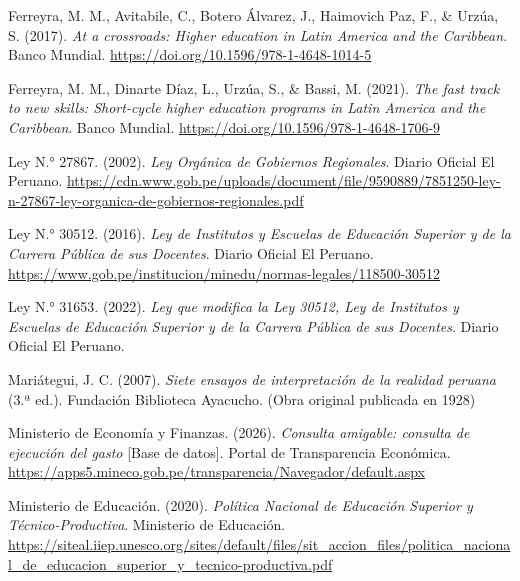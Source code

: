 \documentclass[
  jou,
  floatsintext,
  longtable,
  a4paper,
  nolmodern,
  notxfonts,
  notimes,
  12pt,
  colorlinks=true,linkcolor=blue,citecolor=blue,urlcolor=blue]{apa7}
\newlength{\cslhangindent}
\newenvironment{CSLReferences}[2] %
 {\begin{list}{}{%
  \setlength{\itemindent}{0pt}
  \setlength{\leftmargin}{0pt}
  \setlength{\parsep}{0pt}
  \ifodd #1
   \setlength{\leftmargin}{\cslhangindent}
   \setlength{\itemindent}{-1\cslhangindent}
  \fi
  \setlength{\itemsep}{#2\baselineskip}}}
 {\end{list}}
\begin{document}
\begin{CSLReferences}{1}{0}
Ferreyra, M. M., Avitabile, C., Botero Álvarez, J., Haimovich Paz, F.,
\& Urzúa, S. (2017). \emph{At a crossroads: Higher education in {Latin
America} and the {Caribbean}}. Banco Mundial.
\url{https://doi.org/10.1596/978-1-4648-1014-5}

Ferreyra, M. M., Dinarte Díaz, L., Urzúa, S., \& Bassi, M. (2021).
\emph{The fast track to new skills: Short-cycle higher education
programs in {Latin America} and the {Caribbean}}. Banco Mundial.
\url{https://doi.org/10.1596/978-1-4648-1706-9}

Ley N.° 27867. (2002). \emph{Ley Orgánica de Gobiernos Regionales}.
Diario Oficial El Peruano.
\url{https://cdn.www.gob.pe/uploads/document/file/9590889/7851250-ley-n-27867-ley-organica-de-gobiernos-regionales.pdf}

Ley N.° 30512. (2016). \emph{Ley de Institutos y Escuelas de Educación
Superior y de la Carrera Pública de sus Docentes}. Diario Oficial El
Peruano.
\url{https://www.gob.pe/institucion/minedu/normas-legales/118500-30512}

Ley N.° 31653. (2022). \emph{Ley que modifica la Ley 30512, Ley de
Institutos y Escuelas de Educación Superior y de la Carrera Pública de
sus Docentes}. Diario Oficial El Peruano.

Mariátegui, J. C. (2007). \emph{Siete ensayos de interpretación de la
realidad peruana} (3.ª ed.). Fundación Biblioteca Ayacucho. (Obra
original publicada en 1928)

Ministerio de Economía y Finanzas. (2026). \emph{Consulta amigable:
consulta de ejecución del gasto} {[}Base de datos{]}. Portal de
Transparencia Económica.
\url{https://apps5.mineco.gob.pe/transparencia/Navegador/default.aspx}

Ministerio de Educación. (2020). \emph{Política Nacional de Educación
Superior y Técnico-Productiva}. Ministerio de Educación.
\url{https://siteal.iiep.unesco.org/sites/default/files/sit_accion_files/politica_nacional_de_educacion_superior_y_tecnico-productiva.pdf}


\end{CSLReferences}
\end{document}
